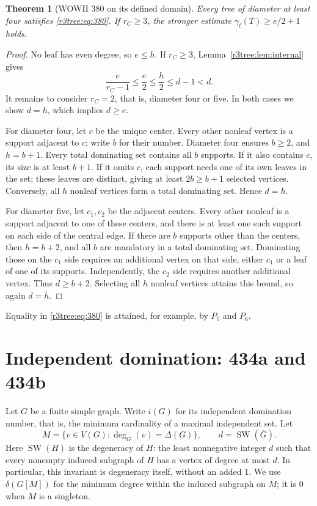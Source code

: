 \documentclass[11pt,a4paper]{article}
\newtheorem{theorem}{Theorem}[section]
\theoremstyle{remark}
\begin{document}
\begin{theorem}[WOWII 380 on its defined domain]
\label{r3tree:thm:380}
Every tree of diameter at least four satisfies
\eqref{r3tree:eq:380}.  If $r_C\ge3$, the stronger estimate
$\gamma_t(T)\ge e/2+1$ holds.
\end{theorem}
\begin{proof}
No leaf has even degree, so $e\le h$.
If $r_C\ge3$, Lemma~\ref{r3tree:lem:internal} gives
\[
\frac{e}{r_C-1}\le\frac e2\le\frac h2\le d-1<d.
\]
It remains to consider $r_C=2$, that is, diameter four or five.
In both cases we show $d=h$, which implies $d\ge e$.

For diameter four, let $c$ be the unique center.  Every other
nonleaf vertex is a support adjacent to $c$; write $b$ for their
number.  Diameter four ensures $b\ge2$, and $h=b+1$.
Every total dominating set contains all $b$ supports.  If it also
contains $c$, its size is at least $b+1$.  If it omits $c$, each
support needs one of its own leaves in the set; these leaves are
distinct, giving at least $2b\ge b+1$ selected vertices.
Conversely, all $h$ nonleaf vertices form a total dominating set.
Hence $d=h$.

For diameter five, let $c_1,c_2$ be the adjacent centers.
Every other nonleaf is a support adjacent to one of these centers,
and there is at least one such support on each side of the central
edge.  If there are $b$ supports other than the centers, then
$h=b+2$, and all $b$ are mandatory in a total dominating set.
Dominating those on the $c_1$ side requires an additional vertex
on that side, either $c_1$ or a leaf of one of its supports.
Independently, the $c_2$ side requires another additional vertex.
Thus $d\ge b+2$.  Selecting all $h$ nonleaf vertices attains this
bound, so again $d=h$.
\end{proof}

Equality in \eqref{r3tree:eq:380} is attained, for example, by
$P_5$ and $P_6$.

\section{Independent domination: 434a and 434b}
\label{sec:degeneracy}

Let $G$ be a finite simple graph.  Write $i(G)$ for its independent
domination number, that is, the minimum cardinality of a maximal independent
set.  Let
\[
 M=\{v\in V(G):\deg_G(v)=\Delta(G)\},
 \qquad d=\operatorname{SW}(\overline G).
\]
Here $\operatorname{SW}(H)$ is the degeneracy of $H$: the least nonnegative
integer $d$ such that every nonempty induced subgraph of $H$ has a vertex of
degree at most $d$.  In particular, this invariant is degeneracy itself,
without an added $1$.  We use $\delta(G[M])$ for the minimum degree within the
induced subgraph on $M$; it is $0$ when $M$ is a singleton.
\end{document}
